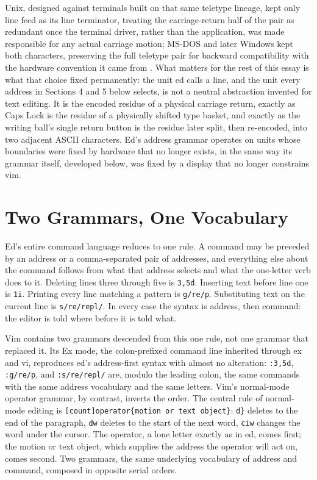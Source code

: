 \documentclass[11pt]{article}
\begin{document}
Unix, designed against terminals built on that same teletype lineage, kept only line feed as its line terminator, treating the carriage-return half of the pair as redundant once the terminal driver, rather than the application, was made responsible for any actual carriage motion; MS-DOS and later Windows kept both characters, preserving the full teletype pair for backward compatibility with the hardware convention it came from \cite{codegenes2026}. What matters for the rest of this essay is what that choice fixed permanently: the unit ed calls a line, and the unit every address in Sections 4 and 5 below selects, is not a neutral abstraction invented for text editing. It is the encoded residue of a physical carriage return, exactly as Caps Lock is the residue of a physically shifted type basket, and exactly as the writing ball's single return button is the residue later split, then re-encoded, into two adjacent ASCII characters. Ed's address grammar operates on units whose boundaries were fixed by hardware that no longer exists, in the same way its grammar itself, developed below, was fixed by a display that no longer constrains vim.

\section{Two Grammars, One Vocabulary}

Ed's entire command language reduces to one rule. A command may be preceded by an address or a comma-separated pair of addresses, and everything else about the command follows from what that address selects and what the one-letter verb does to it. Deleting lines three through five is \texttt{3,5d}. Inserting text before line one is \texttt{1i}. Printing every line matching a pattern is \texttt{g/re/p}. Substituting text on the current line is \texttt{s/re/repl/}. In every case the syntax is address, then command: the editor is told where before it is told what.

Vim contains two grammars descended from this one rule, not one grammar that replaced it. Its Ex mode, the colon-prefixed command line inherited through ex and vi, reproduces ed's address-first syntax with almost no alteration: \texttt{:3,5d}, \texttt{:g/re/p}, and \texttt{:s/re/repl/} are, modulo the leading colon, the same commands with the same address vocabulary and the same letters. Vim's normal-mode operator grammar, by contrast, inverts the order. The central rule of normal-mode editing is \texttt{[count]\allowbreak operator\allowbreak\{motion or text object\}}: \texttt{d\}} deletes to the end of the paragraph, \texttt{dw} deletes to the start of the next word, \texttt{ciw} changes the word under the cursor. The operator, a lone letter exactly as in ed, comes first; the motion or text object, which supplies the address the operator will act on, comes second. Two grammars, the same underlying vocabulary of address and command, composed in opposite serial orders.
\end{document}
